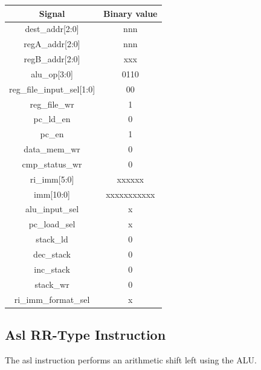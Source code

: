 \documentclass{article}
\begin{document}
\begin{par}
	\begin{center}
		\begin{tabular}{|c|c|}
			\hline 
			\textbf{Signal} & \textbf{Binary value} \\ 
			\hline 
			dest\_addr[2:0] & nnn \\ 
			\hline 
			regA\_addr[2:0] & nnn \\ 
			\hline 
			regB\_addr[2:0] & xxx \\ 
			\hline 
			alu\_op[3:0] & 0110 \\ 
			\hline 
			reg\_file\_input\_sel[1:0] & 00 \\ 
			\hline 
			reg\_file\_wr & 1 \\ 
			\hline 
			pc\_ld\_en & 0 \\ 
			\hline 
			pc\_en & 1 \\ 
			\hline 
			data\_mem\_wr & 0 \\ 
			\hline 
			cmp\_status\_wr & 0 \\ 
			\hline 
			ri\_imm[5:0] & xxxxxx \\ 
			\hline 
			imm[10:0] & xxxxxxxxxxx \\ 
			\hline 
			alu\_input\_sel & x \\ 
			\hline 
			pc\_load\_sel & x \\ 
			\hline 
			stack\_ld & 0 \\ 
			\hline 
			dec\_stack & 0 \\ 
			\hline 
			inc\_stack & 0 \\ 
			\hline 
			stack\_wr & 0 \\ 
			\hline 
			ri\_imm\_format\_sel & x \\ 
			\hline 
		\end{tabular} 
	\end{center}

	\newpage
	\subsection{Asl RR-Type Instruction}
	
	The asl instruction performs an arithmetic shift left using the ALU. 
	

\end{par}
\end{document}
